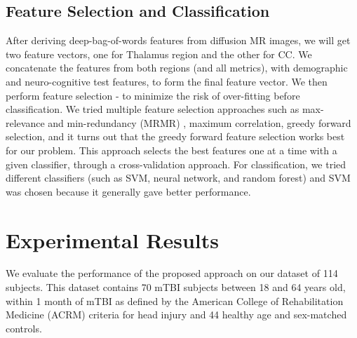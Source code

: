 \documentclass[letterpaper, 10 pt, conference]{ieeeconf}  %
\begin{document}
\subsection{Feature Selection and Classification}
After deriving deep-bag-of-words features from diffusion MR images, we will get two feature vectors, one for Thalamus region and the other for CC.
We concatenate the features from both regions (and all metrics), with demographic and neuro-cognitive test features, to form the final feature vector.
We then perform feature selection \cite{fs1}-\cite{fs2} to minimize the risk of over-fitting before classification.
We tried multiple feature selection approaches such as max-relevance and min-redundancy (MRMR) \cite{mrmr}, maximum correlation, greedy forward selection, and it turns out that the greedy forward feature selection works best for our problem.
This approach selects the best features one at a time  with a given classifier, through a cross-validation approach. 
For classification, we tried different classifiers (such as SVM, neural network, and random forest) and SVM was chosen because it generally gave better performance.



\section{Experimental Results}
We evaluate the performance of the proposed approach on our dataset of 114 subjects. 
This dataset contains 70 mTBI subjects between 18 and 64 years old, within 1 month of mTBI as defined by the American College of Rehabilitation Medicine (ACRM) criteria for head injury and 44 healthy age and sex-matched controls. 
\end{document}
